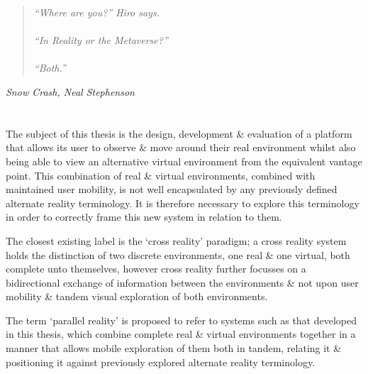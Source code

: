 \begin{quote}
\textit{``Where are you?'' Hiro says.
\\
\\
``In Reality or the Metaverse?''
\\
\\
``Both.''}
\end{quote}
\hfill \textit{Snow Crash, Neal Stephenson}
\\
\\
\\




The subject of this thesis is the design, development \& evaluation of a platform that allows its user to observe \& move around their real environment whilst also being able to view an alternative virtual environment from the equivalent vantage point. This combination of real \& virtual environments, combined with maintained user mobility, is not well encapsulated by any previously defined alternate reality terminology. It is therefore necessary to explore this terminology in order to correctly frame this new system in relation to them.

The closest existing label is the `cross reality' paradigm; a cross reality system holds the distinction of two discrete environments, one real \& one virtual, both complete unto themselves, however cross reality further focusses on a bidirectional exchange of information between the environments \& not upon user mobility \& tandem visual exploration of both environments.

The term `parallel reality' is proposed to refer to systems such as that developed in this thesis, which combine complete real \& virtual environments together in a manner that allows mobile exploration of them both in tandem, relating it \& positioning it against previously explored alternate reality terminology.


